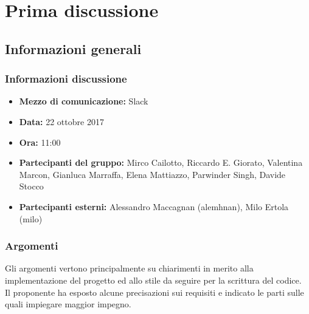 \documentclass[Verbale.tex]{subfiles}
\begin{document}
\chapter{Prima discussione}
\section{Informazioni generali}
\subsection{Informazioni discussione}
\begin{itemize}
	\item \textbf{Mezzo di comunicazione:} Slack
	\item \textbf{Data:} 22 ottobre 2017
	\item \textbf{Ora:} 11:00
	\item \textbf{Partecipanti del gruppo:} Mirco Cailotto, Riccardo E. Giorato, Valentina Marcon, Gianluca Marraffa, Elena Mattiazzo, Parwinder Singh, Davide Stocco
	\item \textbf{Partecipanti esterni:} Alessandro Maccagnan (alemhnan), Milo Ertola (milo)
\end{itemize}
\subsection{Argomenti}
	Gli argomenti vertono principalmente su chiarimenti in merito alla implementazione del progetto ed allo stile da seguire per la scrittura del codice.\\
	Il proponente ha esposto alcune precisazioni sui requisiti e indicato le parti sulle quali impiegare maggior impegno.
\end{document}
